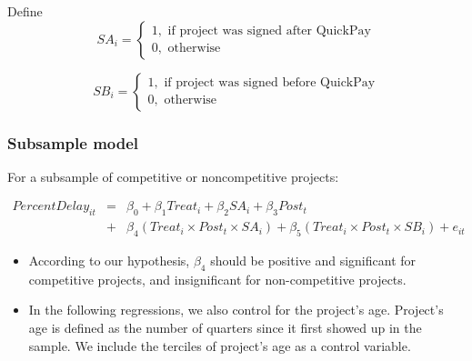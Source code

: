 \documentclass[
]{article}
\begin{document}
Define
\[ SA_i = \begin{cases} 1, \text{ if project was signed after QuickPay}\\
0, \text{ otherwise} \end{cases}\]

\[ SB_i = \begin{cases} 1, \text{ if project was signed before QuickPay}\\
0, \text{ otherwise} \end{cases}\]

\hypertarget{subsample-model}{%
\subsubsection{Subsample model}\label{subsample-model}}

For a subsample of competitive or noncompetitive projects:

\[ \begin{aligned} PercentDelay_{it} &=& \beta_0 +\beta_1 Treat_i+ \beta_2 SA_i+ \beta_3 Post_t \\&+& \beta_4 (Treat_i \times Post_t \times SA_i )+\beta_5 (Treat_i \times Post_t \times SB_i )+e_{it} \end{aligned} \]

\begin{itemize}
\item
  According to our hypothesis, \(\beta_4\) should be positive and
  significant for competitive projects, and insignificant for
  non-competitive projects.
\item
  In the following regressions, we also control for the project's age.
  Project's age is defined as the number of quarters since it first
  showed up in the sample. We include the terciles of project's age as a
  control variable.
\end{itemize}
\end{document}
